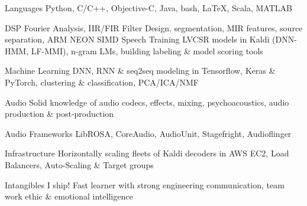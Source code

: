

\begin{cvskills}

  \cvskill
    {Languages} %
    {Python, C/C++, Objective-C, Java, bash, LaTeX, Scala, MATLAB}
    
  \cvskill
    {DSP} %
    {Fourier Analysis, IIR/FIR Filter Design, segmentation, MIR features, source separation, ARM NEON SIMD} %
  \cvskill
    {Speech} %
    {Training LVCSR models in Kaldi (DNN-HMM, LF-MMI), n-gram LMs, building labeling \& model scoring tools} %

  \cvskill
    {Machine Learning} %
    {DNN, RNN \& seq2seq modeling in Tensorflow, Keras \& PyTorch,  clustering \& classification, PCA/ICA/NMF} %
    
  \cvskill
    {Audio} %
    {Solid knowledge of audio codecs, effects, mixing, psychoacoustics, audio production \& post-production } %

  \cvskill
    {Audio Frameworks} %
    {LibROSA, CoreAudio, AudioUnit, Stagefright, Audioflinger} %

  \cvskill
    {Infrastructure} %
    {Horizontally scaling fleets of Kaldi decoders in AWS EC2, Load Balancers, Auto-Scaling \& Target groups} %

  \cvskill
    {Intangibles} %
    {I ship! Fast learner with strong engineering communication, team work ethic \& emotional intelligence} %



\end{cvskills}

